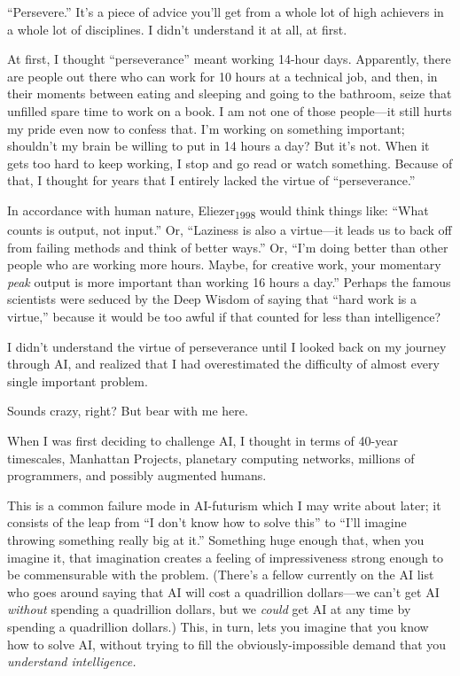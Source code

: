 \myendsectiontext


{
 ``Persevere.''
It's a piece of advice you'll get from
a whole lot of high achievers in a whole lot of disciplines. I
didn't understand it at all, at first. }

{
 At first, I thought
``perseverance'' meant working
14-hour days. Apparently, there are people out there who can work for
10 hours at a technical job, and then, in their moments between eating
and sleeping and going to the bathroom, seize that unfilled spare time
to work on a book. I am not one of those people---it still hurts my
pride even now to confess that. I'm working on
something important; shouldn't my brain be willing to
put in 14 hours a day? But it's not. When it gets too
hard to keep working, I stop and go read or watch something. Because of
that, I thought for years that I entirely lacked the virtue of
``perseverance.''}

{
 In accordance with human nature, Eliezer\textsubscript{1998} would
think things like: ``What counts is output, not
input.'' Or, ``Laziness is also a
virtue---it leads us to back off from failing methods and think of
better ways.'' Or,
``I'm doing better than other people
who are working more hours. Maybe, for creative work, your momentary
\textit{peak} output is more important than working 16 hours a
day.'' Perhaps the famous scientists were seduced by
the Deep Wisdom of saying that ``hard work is a
virtue,'' because it would be too awful if that
counted for less than intelligence?}

{
 I didn't understand the virtue of perseverance
until I looked back on my journey through AI, and realized that I had
overestimated the difficulty of almost every single important problem.}

{
 Sounds crazy, right? But bear with me here.}

{
 When I was first deciding to challenge AI, I thought in terms of
40-year timescales, Manhattan Projects, planetary computing networks,
millions of programmers, and possibly augmented humans.}

{
 This is a common failure mode in AI-futurism which I may write
about later; it consists of the leap from ``I
don't know how to solve this'' to
``I'll imagine throwing something
really big at it.'' Something huge enough that, when
you imagine it, that imagination creates a feeling of impressiveness
strong enough to be commensurable with the problem.
(There's a fellow currently on the AI list who goes
around saying that AI will cost a quadrillion dollars---we
can't get AI \textit{without} spending a quadrillion
dollars, but we \textit{could} get AI at any time by spending a
quadrillion dollars.) This, in turn, lets you imagine that you know how
to solve AI, without trying to fill the obviously-impossible demand
that you \textit{understand intelligence.}}

